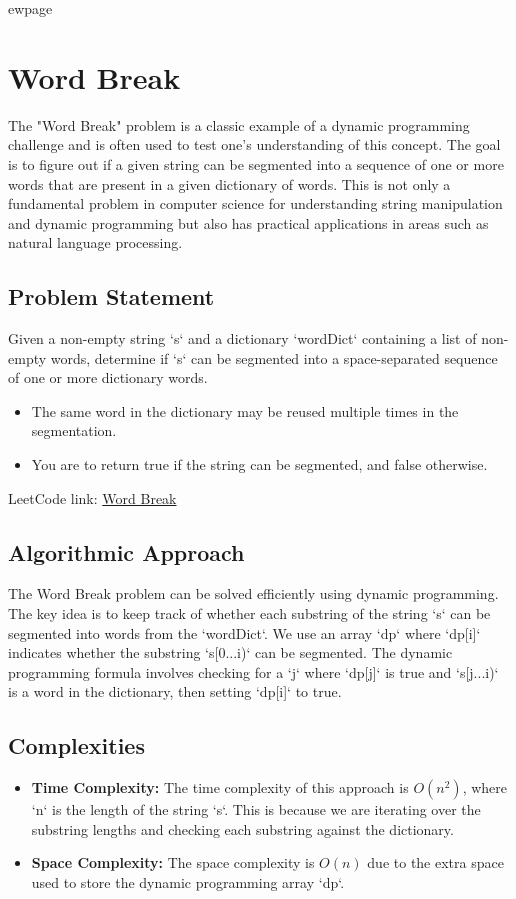 
ewpage

\chapter{Word Break}
\label{chap:Word_Break}
The "Word Break" problem is a classic example of a dynamic programming challenge and is often used to test one's understanding of this concept. The goal is to figure out if a given string can be segmented into a sequence of one or more words that are present in a given dictionary of words. This is not only a fundamental problem in computer science for understanding string manipulation and dynamic programming but also has practical applications in areas such as natural language processing.

\section*{Problem Statement}
Given a non-empty string `s` and a dictionary `wordDict` containing a list of non-empty words, determine if `s` can be segmented into a space-separated sequence of one or more dictionary words.

\begin{itemize}
\item The same word in the dictionary may be reused multiple times in the segmentation.
\item You are to return true if the string can be segmented, and false otherwise.
\end{itemize}

LeetCode link: \href{https://leetcode.com/problems/word-break/}{Word Break}

\section*{Algorithmic Approach}
The Word Break problem can be solved efficiently using dynamic programming. The key idea is to keep track of whether each substring of the string `s` can be segmented into words from the `wordDict`. We use an array `dp` where `dp[i]` indicates whether the substring `s[0...i)` can be segmented. The dynamic programming formula involves checking for a `j` where `dp[j]` is true and `s[j...i)` is a word in the dictionary, then setting `dp[i]` to true.

\section*{Complexities}
\begin{itemize}
	\item \textbf{Time Complexity:} The time complexity of this approach is \(O(n^2)\), where `n` is the length of the string `s`. This is because we are iterating over the substring lengths and checking each substring against the dictionary.
	\item \textbf{Space Complexity:} The space complexity is \(O(n)\) due to the extra space used to store the dynamic programming array `dp`.
\end{itemize}


